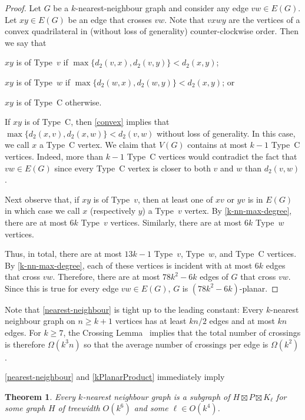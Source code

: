 \documentclass{patmorin}
\theoremstyle{plain}
\newtheorem{thm}{Theorem}
\theoremstyle{definition}
\renewcommand{\ge}{\geqslant}
\begin{document}
\begin{proof}
  Let $G$ be a $k$-nearest-neighbour graph and consider any edge $vw\in E(G)$.
  Let $xy\in E(G)$ be an edge that crosses $vw$.  Note that $vxwy$ are the vertices of a convex quadrilateral in (without loss of generality) counter-clockwise order. Then we say that
  \begin{compactenum}
    \item $xy$ is of Type~$v$ if $\max\{d_2(v,x), d_2(v,y)\}< d_2(x,y)$;
    \item $xy$ is of Type~$w$ if $\max\{d_2(w,x), d_2(w,y)\}< d_2(x,y)$; or
    \item $xy$ is of Type~C otherwise.
  \end{compactenum}
  If $xy$ is of Type~C, then \cref{convex} implies that $\max\{d_2(x,v),d_2(x,w)\} < d_2(v,w)$ without loss of generality.
   In this case, we call $x$ a Type~C vertex.  We claim that $V(G)$ contains at most $k-1$ Type~C vertices.  Indeed, more than $k-1$ Type~C vertices would contradict the fact that $vw\in E(G)$ since every Type~C vertex is closer to both $v$ and $w$ than $d_2(v,w)$.

  Next observe that, if $xy$ is of Type~$v$, then at least one of $xv$ or $yv$ is in $E(G)$ in which case we call $x$ (respectively $y$) a Type~$v$ vertex.  By \cref{k-nn-max-degree}, there are at most $6k$ Type~$v$ vertices.  Similarly, there are at most $6k$ Type~$w$ vertices.

  Thus, in total, there are at most $13k-1$ Type~$v$, Type~$w$, and Type~C vertices. By \cref{k-nn-max-degree}, each of these vertices is incident with at most $6k$ edges that cross $vw$. Therefore, there are at most $78k^2-6k$ edges of $G$ that cross $vw$.  Since this is true for every edge $vw\in E(G)$, $G$ is $(78k^2-6k)$-planar.
\end{proof}

Note that \cref{nearest-neighbour} is tight up to the leading constant:  Every $k$-nearest neighbour graph on $n\ge k+1$ vertices has at least $kn/2$ edges and at most $kn$ edges.  For $k\ge 7$, the Crossing Lemma~\citep{ajtai.chvatal.ea:crossing-free,leighton:complexity} implies that the total number of crossings is therefore $\Omega(k^3n)$ so that the average number of crossings per edge is $\Omega(k^2)$.

\cref{nearest-neighbour} and \cref{kPlanarProduct} immediately imply


\begin{thm}
  Every $k$-nearest neighbour graph is a subgraph of $H\boxtimes P\boxtimes K_{\ell}$ for some graph $H$ of treewidth $O(k^6)$ and some $\ell\in O(k^4)$.
\end{thm}
\end{document}
